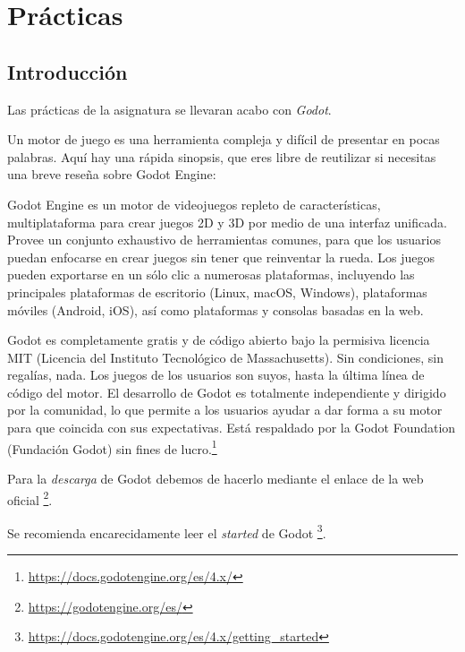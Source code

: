 \documentclass[12pt]{report} %
\begin{document}
\part{Prácticas}

\hypertarget{introducciuxf3n-1}{%
\chapter{Introducción}\label{introducciuxf3n-1}}

Las prácticas de la asignatura se llevaran acabo con \emph{Godot}.

Un motor de juego es una herramienta compleja y difícil de presentar en
pocas palabras. Aquí hay una rápida sinopsis, que eres libre de
reutilizar si necesitas una breve reseña sobre Godot Engine:

Godot Engine es un motor de videojuegos repleto de características,
multiplataforma para crear juegos 2D y 3D por medio de una interfaz
unificada. Provee un conjunto exhaustivo de herramientas comunes, para
que los usuarios puedan enfocarse en crear juegos sin tener que
reinventar la rueda. Los juegos pueden exportarse en un sólo clic a
numerosas plataformas, incluyendo las principales plataformas de
escritorio (Linux, macOS, Windows), plataformas móviles (Android, iOS),
así como plataformas y consolas basadas en la web.

Godot es completamente gratis y de código abierto bajo la permisiva
licencia MIT (Licencia del Instituto Tecnológico de Massachusetts). Sin
condiciones, sin regalías, nada. Los juegos de los usuarios son suyos,
hasta la última línea de código del motor. El desarrollo de Godot es
totalmente independiente y dirigido por la comunidad, lo que permite a
los usuarios ayudar a dar forma a su motor para que coincida con sus
expectativas. Está respaldado por la Godot Foundation (Fundación Godot)
sin fines de lucro.\footnote{\url{https://docs.godotengine.org/es/4.x/}}

Para la \emph{descarga} de Godot debemos de hacerlo mediante el enlace
de la web oficial \footnote{\url{https://godotengine.org/es/}}.


Se recomienda encarecidamente leer el \emph{started} de Godot
\footnote{\url{https://docs.godotengine.org/es/4.x/getting_started}}.
\end{document}
